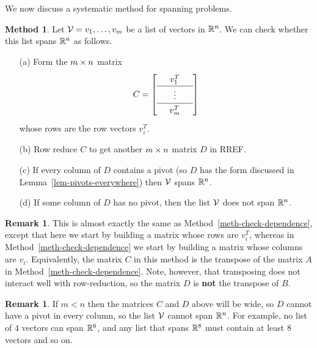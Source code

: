 \documentclass[reqno]{amsart}
\theoremstyle{definition}
\newtheorem{remark}[theorem]{Remark}
\newtheorem{method}[theorem]{Method}
\begin{document}
We now discuss a systematic method for spanning problems.

\begin{method}\label{meth-check-span}
 Let $\mathcal{V}=v_1,\dotsc,v_m$ be a list of vectors in ${\mathbb{R}}^n$.  We can
 check whether this list spans ${\mathbb{R}}^n$ as follows.
 \begin{itemize}
  \item[(a)] Form the $m\times n$ matrix
   \[ \renewcommand{\arraystretch}{1.3}
       C = \left[\begin{array}{ccc}
              & v_1^T & \\ \hline
              & \vdots & \\ \hline
              & v_m^T &
            \end{array}\right]
   \]
   whose rows are the row vectors $v_i^T$.
  \item[(b)] Row reduce $C$ to get another $m\times n$ matrix $D$ in
   RREF.
  \item[(c)] If every column of $D$ contains a pivot (so $D$ has the
   form discussed in Lemma~\ref{lem-pivots-everywhere}) then $\mathcal{V}$
   spans ${\mathbb{R}}^n$.
  \item[(d)] If some column of $D$ has no pivot, then the list $\mathcal{V}$
   does not span ${\mathbb{R}}^n$.
 \end{itemize}
\end{method}
\begin{remark}\label{rem-dual-methods}
 This is almost exactly the same as
 Method~\ref{meth-check-dependence}, except that here we start by
 building a matrix whose rows are $v_i^T$, whereas in
 Method~\ref{meth-check-dependence} we start by building a matrix
 whose columns are $v_i$.  Equivalently, the matrix $C$ in this method
 is the transpose of the matrix $A$ in
 Method~\ref{meth-check-dependence}.  Note, however, that transposing
 does not interact well with row-reduction, so the matrix $D$ is
 \textbf{not} the transpose of $B$.
\end{remark}
\begin{remark}\label{rem-spanning-shortcut}
 If $m<n$ then the matrices $C$ and $D$ above will be wide, so $D$
 cannot have a pivot in every column, so the list $\mathcal{V}$ cannot span
 ${\mathbb{R}}^n$.  For example, no list of $4$ vectors can span ${\mathbb{R}}^6$, and any
 list that spans ${\mathbb{R}}^8$ must contain at least $8$ vectors and so on.
\end{remark}
\end{document}
